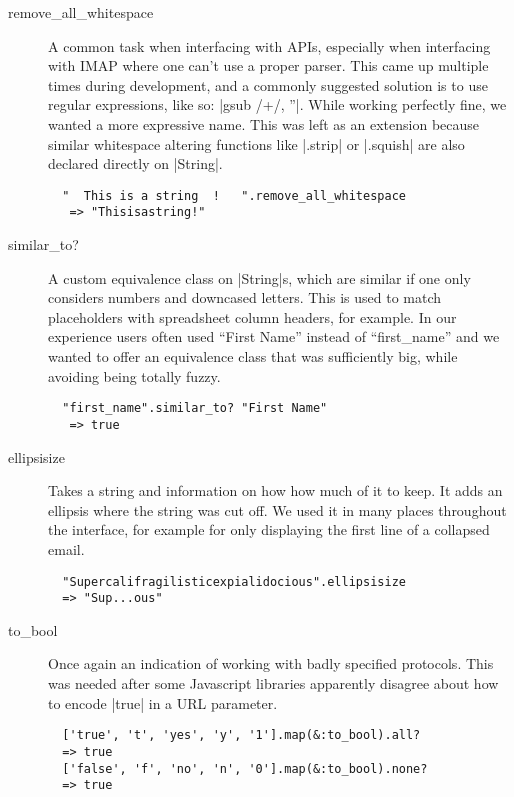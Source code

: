 \begin{description}

\item[remove\_all\_whitespace] A common task when interfacing with APIs, especially when interfacing with IMAP where one can't use a proper parser. This came up multiple times during development, and a commonly suggested solution is to use regular expressions, like so: |gsub /\s+/, ''|. While working perfectly fine, we wanted a more expressive name. This was left as an extension because similar whitespace altering functions like |.strip| or  |.squish| are also declared directly on |String|.
\\
\begin{lstlisting}
  "  This is a string  !   ".remove_all_whitespace
   => "Thisisastring!"
\end{lstlisting}

\item[similar\_to?] A custom equivalence class on |String|s, which are similar if one only considers numbers and downcased letters. This is used to match placeholders with spreadsheet column headers, for example.
In our experience users often used ``First Name'' instead of ``first\_name'' and we wanted to offer an equivalence class that was sufficiently big, while avoiding being totally fuzzy.
\\
\begin{lstlisting}
  "first_name".similar_to? "First Name"
   => true
\end{lstlisting}

\item[ellipsisize] Takes a string and information on how how much of it to keep. It adds an ellipsis where the string was cut off. We used it in many places throughout the interface, for example for only displaying the first line of a collapsed email.
\\
\begin{lstlisting}
  "Supercalifragilisticexpialidocious".ellipsisize
  => "Sup...ous"
\end{lstlisting}


\item[to\_bool] Once again an indication of working with badly specified protocols. This was needed after some Javascript libraries apparently disagree about how to encode |true| in a URL parameter.
\\
\begin{lstlisting}
  ['true', 't', 'yes', 'y', '1'].map(&:to_bool).all?
  => true
  ['false', 'f', 'no', 'n', '0'].map(&:to_bool).none?
  => true
\end{lstlisting}

\end{description}

